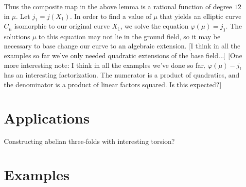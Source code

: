 \documentclass[reqno, 12pt]{amsart}
\theoremstyle{definition}
\newcommand{\sss}[1]{{\color{blue} [#1]}}
\begin{document}
Thus the composite map in the above lemma is a rational function of degree $12$ in $\mu$. Let $j_1 = j(X_1)$. In order to find a value of $\mu$ that yields an elliptic curve $C_\mu$ isomorphic to our original curve $X_1$, we solve the equation $\varphi(\mu) = j_1$. The solutions $\mu$ to this equation may not lie in the ground field, so it may be necessary to base change our curve to an algebraic extension. \sss{I think in all the examples so far we've only needed quadratic extensions of the base field...} \sss{One more interesting note: I think in all the examples we've done so far, $\varphi(\mu) - j_1$ has an interesting factorization. The numerator is a product of quadratics, and the denominator is a product of linear factors squared. Is this expected?}

\section{Applications}
Constructing abelian three-folds with interesting torsion?

\section{Examples}

%


\end{document}
